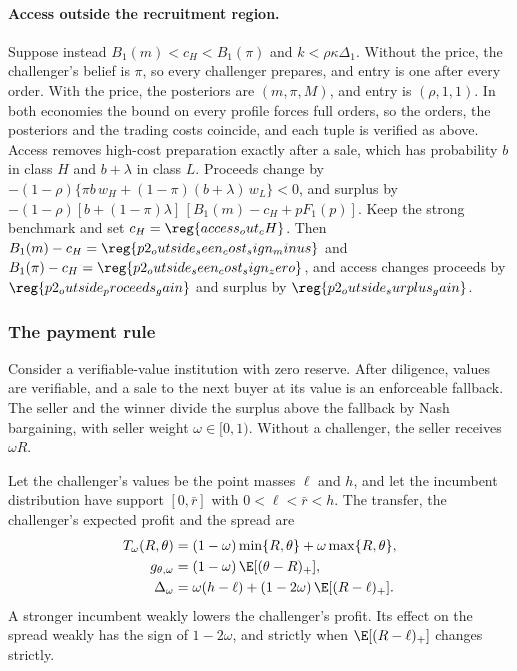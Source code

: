 \paragraph{Access outside the recruitment region.}
Suppose instead \(B_1(m)<c_H<B_1(\pi)\) and \(k<\rho\kappa\Delta_1\). Without the price, the challenger's belief is
\(\pi\), so every challenger prepares, and entry is one after every order. With the price, the posteriors are
\((m,\pi,M)\), and entry is \((\rho,1,1)\). In both economies the bound on every profile forces full orders, so the
orders, the posteriors and the trading costs coincide, and each tuple is verified as above. Access removes
high-cost preparation exactly after a sale, which has probability \(b\) in class \(H\) and \(b+\lambda\) in class
\(L\). Proceeds change by \(-(1-\rho)\{\pi b\,w_H+(1-\pi)(b+\lambda)\,w_L\}<0\), and surplus by
\(-(1-\rho)[b+(1-\pi)\lambda]\,[B_1(m)-c_H+pF_1(p)]\). Keep the strong benchmark and set
\(c_H=\reg{access_out_cH}\). Then \(B_1(m)-c_H=\reg{p2_outside_seen_cost_sign_minus}\) and
\(B_1(\pi)-c_H=\reg{p2_outside_seen_cost_sign_zero}\), and access changes proceeds by \(\reg{p2_outside_proceeds_gain}\)
and surplus by \(\reg{p2_outside_surplus_gain}\).

\subsubsection*{The payment rule}

Consider a verifiable-value institution with zero reserve. After diligence, values are verifiable, and a sale to
the next buyer at its value is an enforceable fallback. The seller and the winner divide the surplus above the
fallback by Nash bargaining, with seller weight \(\omega\in[0,1)\). Without a challenger, the seller receives
\(\omega R\).

\begin{proposition}\label{prop:payment}
Let the challenger's values be the point masses \(\ell\) and \(h\), and let the incumbent distribution have support
\([0,\bar r]\) with \(0<\ell<\bar r<h\). The transfer, the challenger's expected profit and the spread are
\[
\begin{aligned}
T_\omega(R,\theta)&=(1-\omega)\min\{R,\theta\}+\omega\max\{R,\theta\},\\
g_{\theta,\omega}&=(1-\omega)\,\E[(\theta-R)_+],\\
\Delta_\omega&=\omega(h-\ell)+(1-2\omega)\,\E[(R-\ell)_+].
\end{aligned}
\]
A stronger incumbent weakly lowers the challenger's profit. Its effect on the spread weakly has the sign of
\(1-2\omega\), and strictly when \(\E[(R-\ell)_+]\) changes strictly.
\end{proposition}

